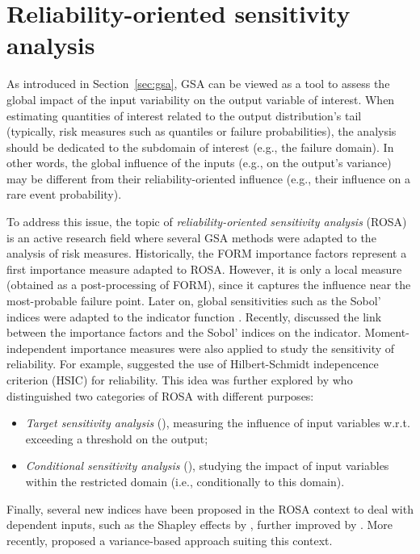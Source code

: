\section{Reliability-oriented sensitivity analysis}\label{sec:bancs_rosa}


As introduced in Section~\ref{sec:gsa}, GSA can be viewed as a tool to assess the global impact of the input variability on the output variable of interest. 
When estimating quantities of interest related to the output distribution's tail (typically, risk measures such as quantiles or failure probabilities), the analysis should be dedicated to the subdomain of interest (e.g., the failure domain). 
In other words, the global influence of the inputs (e.g., on the output's variance) may be different from their reliability-oriented influence (e.g., their influence on a rare event probability). 

To address this issue, the topic of \textit{reliability-oriented sensitivity analysis} (ROSA) is an active research field where several GSA methods were adapted to the analysis of risk measures. 
Historically, the FORM importance factors represent a first importance measure adapted to ROSA. 
However, it is only a local measure (obtained as a post-processing of FORM), since it captures the influence near the most-probable failure point.  
Later on, global sensitivities such as the Sobol' indices were adapted to the indicator function \citep{wei_2012_rosa,chabridon_2018_thesis,perrin_2019_rosa}. 
Recently, \citet{papaioannou_2021_rosa_form} discussed the link between the importance factors and the Sobol' indices on the indicator. 
Moment-independent importance measures were also applied to study the sensitivity of reliability. 
For example, \citet{daveiga_2015} suggested the use of Hilbert-Schmidt indepencence criterion (HSIC) for reliability. 
This idea was further explored by \citet{marrel_chabridon_2021} who distinguished two categories of ROSA with different purposes: 
\begin{itemize}
    \item \textit{Target sensitivity analysis} (), measuring the influence of input variables w.r.t. exceeding a threshold on the output; 
    \item \textit{Conditional sensitivity analysis} (), studying the impact of input variables within the restricted domain (i.e., conditionally to this domain).
\end{itemize}
Finally, several new indices have been proposed in the ROSA context to deal with dependent inputs, such as the Shapley effects by \citet{ilidrissi_2021_rosa}, further improved by \citet{demange_2023_ijuq}. 
More recently, \citet{ehre_2024_vb_rosa} proposed a variance-based approach suiting this context. 


